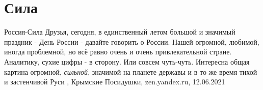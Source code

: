  
 
 
 
 
\chapter{Сила}
\label{sec:slova.sila}

Россия-Сила
Друзья, сегодня, в единственный летом большой и значимый праздник - День России
- давайте говорить о России. Нашей огромной, любимой, иногда проблемной, но всё
равно очень и очень привлекательной стране.  Аналитику, сухие цифры - в
сторону. Или совсем чуть-чуть. Интересна общая картина огромной,
\emph{сильной}, значимой на планете державы и в то же время тихой и застенчивой
Руси
, 
Крымские Посидушки, zen.yandex.ru, 12.06.2021

